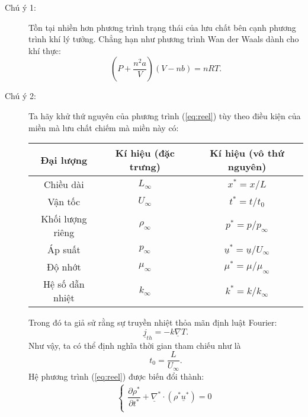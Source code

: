\documentclass[../../../main.tex]{subfiles}
\begin{document}
    \begin{description}
        \item[Chú ý 1:] Tồn tại nhiền hơn phương trình trạng thái của lưu chất bên cạnh phương trình khí lý tưởng. Chẳng hạn như phương trình Wan der Waals dành cho khí thực:
            \[
                \left(P+\dfrac{n^2a}{V}\right)\left(V-nb\right)=nRT.
            \]
        \item[Chú ý 2:] Ta hãy khử thứ nguyên của phương trình (\ref{eq:reel}) tùy theo điều kiện của miền mà lưu chất chiếm mà miền này có:
        \begin{center}
            \begin{tabular}{||c|c|c||}
                \hline
                    Đại lượng & Kí hiệu (đặc trưng) & Kí hiệu (vô thứ nguyên)\tabularnewline
                \hline
                \hline
                    Chiều dài & $L_{\infty}$ & $x^*=x/L$ \tabularnewline
                \hline
                    Vận tốc & $U_{\infty}$ & $t^*=t/t_0$ \tabularnewline
                \hline
                    Khối lượng riêng & $\rho_{\infty}$ & $p^*=p/p_\infty$ \tabularnewline
                \hline
                    Áp suất & $p_{\infty}$ & $\underline{u}^*=\underline{u}/U_\infty$ \tabularnewline
                \hline
                    Độ nhớt & $\mu_{\infty}$ & $\mu^*=\mu/\mu_\infty$ \tabularnewline
                \hline
                    Hệ số dẫn nhiệt & $k_{\infty}$ & $k^*=k/k_\infty $\tabularnewline
                \hline
            \end{tabular}
        \end{center}
        Trong đó ta giả sử rằng sự truyền nhiệt thỏa mãn định luật Fourier:
            \[
                \underline{j}_{th}=-k\underline{\nabla}T.
            \]
        Như vậy, ta có thể định nghĩa thời gian tham chiếu như là
            \[
                t_0 =\dfrac{L}{U_\infty}.
            \]
        Hệ phương trình (\ref{eq:reel}) được biến đổi thành:
            \[
                \begin{aligned}
                    \begin{cases}
                        \dfrac{\partial\rho^*}{\partial t^*}+\underline{\nabla}^*\cdot\left(\rho^*\underline{u}^*\right)=0\\[10pt]

\end{cases}
\end{aligned}\]
\end{description}
\end{document}
